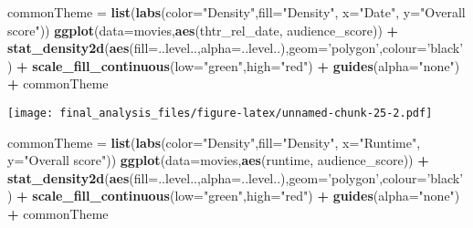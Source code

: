 \documentclass[]{article}
\newenvironment{Shaded}{\begin{snugshade}}{\end{snugshade}}
\newcommand{\DataTypeTok}[1]{\textcolor[rgb]{0.13,0.29,0.53}{#1}}
\newcommand{\KeywordTok}[1]{\textcolor[rgb]{0.13,0.29,0.53}{\textbf{#1}}}
\newcommand{\NormalTok}[1]{#1}
\newcommand{\OperatorTok}[1]{\textcolor[rgb]{0.81,0.36,0.00}{\textbf{#1}}}
\newcommand{\StringTok}[1]{\textcolor[rgb]{0.31,0.60,0.02}{#1}}
\begin{document}
\begin{Shaded}
\begin{Highlighting}[]
\NormalTok{commonTheme =}\StringTok{ }\KeywordTok{list}\NormalTok{(}\KeywordTok{labs}\NormalTok{(}\DataTypeTok{color=}\StringTok{"Density"}\NormalTok{,}\DataTypeTok{fill=}\StringTok{"Density"}\NormalTok{, }\DataTypeTok{x=}\StringTok{"Date"}\NormalTok{, }\DataTypeTok{y=}\StringTok{"Overall score"}\NormalTok{))}
\KeywordTok{ggplot}\NormalTok{(}\DataTypeTok{data=}\NormalTok{movies,}\KeywordTok{aes}\NormalTok{(thtr_rel_date, audience_score)) }\OperatorTok{+}\StringTok{ }
\StringTok{  }\KeywordTok{stat_density2d}\NormalTok{(}\KeywordTok{aes}\NormalTok{(}\DataTypeTok{fill=}\NormalTok{..level..,}\DataTypeTok{alpha=}\NormalTok{..level..),}\DataTypeTok{geom=}\StringTok{'polygon'}\NormalTok{,}\DataTypeTok{colour=}\StringTok{'black'}\NormalTok{) }\OperatorTok{+}\StringTok{ }
\StringTok{  }\KeywordTok{scale_fill_continuous}\NormalTok{(}\DataTypeTok{low=}\StringTok{"green"}\NormalTok{,}\DataTypeTok{high=}\StringTok{"red"}\NormalTok{) }\OperatorTok{+}
\StringTok{  }\KeywordTok{guides}\NormalTok{(}\DataTypeTok{alpha=}\StringTok{"none"}\NormalTok{) }\OperatorTok{+}
\StringTok{  }\NormalTok{commonTheme}
\end{Highlighting}
\end{Shaded}

\texttt{[image: final\_analysis\_files/figure-latex/unnamed-chunk-25-2.pdf]}

\begin{Shaded}
\begin{Highlighting}[]
\NormalTok{commonTheme =}\StringTok{ }\KeywordTok{list}\NormalTok{(}\KeywordTok{labs}\NormalTok{(}\DataTypeTok{color=}\StringTok{"Density"}\NormalTok{,}\DataTypeTok{fill=}\StringTok{"Density"}\NormalTok{, }\DataTypeTok{x=}\StringTok{"Runtime"}\NormalTok{, }\DataTypeTok{y=}\StringTok{"Overall score"}\NormalTok{))}
\KeywordTok{ggplot}\NormalTok{(}\DataTypeTok{data=}\NormalTok{movies,}\KeywordTok{aes}\NormalTok{(runtime, audience_score)) }\OperatorTok{+}\StringTok{ }
\StringTok{  }\KeywordTok{stat_density2d}\NormalTok{(}\KeywordTok{aes}\NormalTok{(}\DataTypeTok{fill=}\NormalTok{..level..,}\DataTypeTok{alpha=}\NormalTok{..level..),}\DataTypeTok{geom=}\StringTok{'polygon'}\NormalTok{,}\DataTypeTok{colour=}\StringTok{'black'}\NormalTok{) }\OperatorTok{+}\StringTok{ }
\StringTok{  }\KeywordTok{scale_fill_continuous}\NormalTok{(}\DataTypeTok{low=}\StringTok{"green"}\NormalTok{,}\DataTypeTok{high=}\StringTok{"red"}\NormalTok{) }\OperatorTok{+}
\StringTok{  }\KeywordTok{guides}\NormalTok{(}\DataTypeTok{alpha=}\StringTok{"none"}\NormalTok{) }\OperatorTok{+}
\StringTok{   }\NormalTok{commonTheme}
\end{Highlighting}
\end{Shaded}
\end{document}
